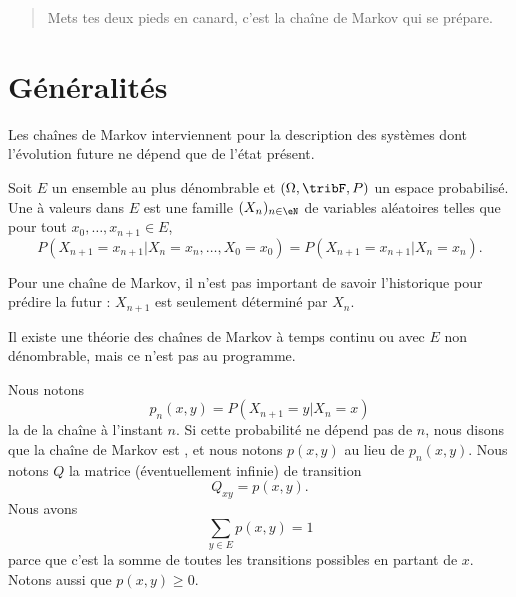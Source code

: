
\begin{quote}
    Mets tes deux pieds en canard, c'est la chaîne de Markov qui se prépare.
\end{quote}

\section{Généralités}

Les chaînes de Markov interviennent pour la description des systèmes dont l'évolution future ne dépend que de l'état présent.

\begin{definition}
    Soit \( E\) un ensemble au plus dénombrable et \( (\Omega,\tribF,P)\) un espace probabilisé. Une  à valeurs dans \( E\) est une famille \( (X_n)_{n\in\eN}\) de variables aléatoires telles que pour tout \( x_0,\ldots,x_{n+1}\in E\),
    \begin{equation}
        P(X_{n+1}=x_{n+1}|X_n=x_n,\ldots,X_0=x_0)=P(X_{n+1}=x_{n+1}|X_n=x_n).
    \end{equation}
\end{definition}
Pour une chaîne de Markov, il n'est pas important de savoir l'historique pour prédire la futur : \( X_{n+1}\) est seulement déterminé par \( X_n\).

\begin{remark}
    Il existe une théorie des chaînes de Markov à temps continu ou avec \( E\) non dénombrable, mais ce n'est pas au programme.
\end{remark}

Nous notons
\begin{equation}
    p_n(x,y)=P(X_{n+1}=y|X_n=x)
\end{equation}
la  de la chaîne à l'instant \( n\). Si cette probabilité ne dépend pas de \( n\), nous disons que la chaîne de Markov est , et nous notons \( p(x,y)\) au lieu de \( p_n(x,y)\). Nous notons \( Q\) la matrice (éventuellement infinie) de transition
\begin{equation}
    Q_{xy}=p(x,y).
\end{equation}
Nous avons
\begin{equation}
    \sum_{y\in E}p(x,y)=1
\end{equation}
parce que c'est la somme de toutes les transitions possibles en partant de \( x\). Notons aussi que \( p(x,y)\geq 0\).

